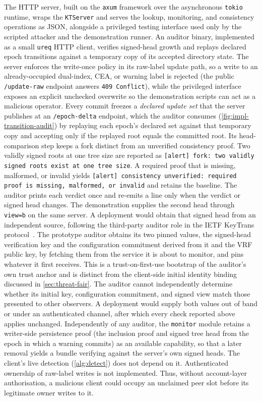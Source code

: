 The HTTP server, built on the
\texttt{axum} framework over the asynchronous \texttt{tokio} runtime, wraps the \texttt{KTServer}
and serves the lookup, monitoring, and consistency operations as JSON, alongside a privileged
testing interface used only by the scripted attacker and the demonstration runner. An auditor binary, implemented as a small \texttt{ureq} HTTP client, verifies signed-head growth and
replays declared epoch transitions against a temporary copy of its accepted directory state. The server enforces the write-once policy in its raw-label
update path, so a write to an already-occupied dual-index, CEA, or warning label is rejected (the public
\texttt{/update-raw} endpoint answers \texttt{409 Conflict}), while the privileged interface exposes
an explicit unchecked overwrite so the demonstration scripts can act as a malicious operator. Every commit
freezes a \emph{declared update set} that the server publishes at an \texttt{/epoch-delta} endpoint,
which the auditor consumes (\cref{fig:impl-transition-audit}) by replaying each epoch's declared set
against that temporary copy and accepting only if the replayed root equals the committed root. Its head-comparison step keeps a fork distinct from an unverified consistency proof. Two validly
signed roots at one tree size are reported as \texttt{[alert] fork: two validly signed roots exist
at one tree size}. A required proof that is missing, malformed, or invalid yields \texttt{[alert]
consistency unverified: required proof is missing, malformed, or invalid} and retains the baseline.
The auditor prints each verdict once and re-emits a line only when the verdict or signed head changes.
The demonstration supplies the second head through \texttt{view=b} on the same server. A deployment
would obtain that signed head from an independent source, following the third-party auditor role in
the IETF KeyTrans protocol~\cite{ietf-keytrans-protocol}.
The prototype auditor obtains its two pinned values, the signed-head verification key and the
configuration commitment derived from it and the VRF public key, by fetching them from the service
it is about to monitor, and pins whatever it first receives. This is a trust-on-first-use bootstrap
of the auditor's own trust anchor and is distinct from the client-side initial identity binding
discussed in \cref{sec:threat-fair}. The auditor cannot independently determine whether its initial
key, configuration commitment, and signed view match those presented to other observers. A deployment would supply both values out of band or under an authenticated channel, after
which every check reported above applies unchanged.
Independently of any auditor, the \texttt{monitor} module retains a writer-side persistence proof
(the inclusion proof and signed tree head from the epoch in which a warning commits) as an available
capability, so that a later removal yields a bundle verifying against the server's own signed heads.
The client's live detection (\cref{alg:detect}) does not depend on it.
Authenticated ownership of raw-label writes is not implemented. Thus, without account-layer
authorisation, a malicious client could occupy an unclaimed peer slot before its legitimate owner
writes to it.


